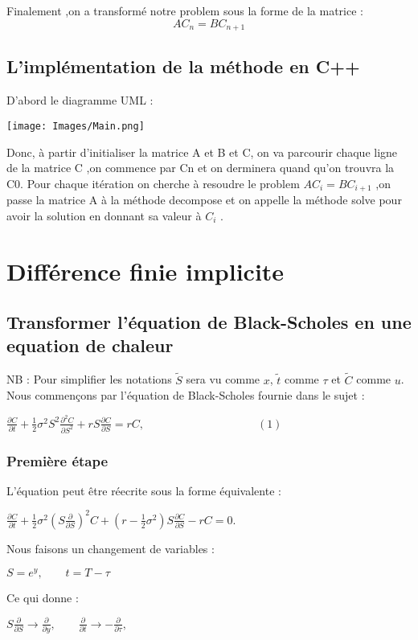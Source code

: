 \documentclass[a4paper, 12pt]{article}
\begin{document}
Finalement ,on a transformé notre problem sous la forme de la matrice :\\
\[
\boxed{AC_n = BC_{n+1}}
\]

\subsection{L'implémentation de la méthode en C++}

D'abord le diagramme UML :


\texttt{[image: Images/Main.png]} 

Donc,  à partir d'initialiser la matrice A et B et C, on va parcourir chaque ligne de la matrice C
,on commence par Cn et on derminera quand qu'on trouvra la C0. Pour chaque itération on cherche à resoudre le problem $AC_i = BC_{i+1}$ ,on passe la matrice A à la méthode decompose et on appelle la méthode solve pour avoir la solution en donnant sa valeur à $C_i$ .

\section{Différence finie implicite}
\subsection{Transformer l'équation de Black-Scholes en une equation de chaleur}
NB : Pour simplifier les notations $\widetilde{S}$ sera vu comme $x$, $\widetilde{t}$ comme $\tau$ et $\widetilde{C}$ comme $u$.
Nous commençons par l'équation de Black-Scholes fournie dans le sujet :

$\frac{\partial C}{\partial t}+\frac{1}{2}\sigma^2S^2\frac{\partial^2 C}{\partial S^2}+ rS\frac{\partial C}{\partial S}=rC,\qquad\qquad\qquad\qquad\qquad(1)$

\subsubsection{Première étape}
L'équation peut être réecrite sous la forme équivalente :

$\frac{\partial C}{\partial t}+\frac{1}{2}\sigma^2\left(S\frac{\partial }{\partial S}\right)^2C+\left(r-\frac{1}{2}\sigma^2\right)S\frac{\partial C}{\partial S}-rC=0.$

Nous faisons un changement de variables :

$S=e^y,\qquad t=T-\tau$

Ce qui donne :

$S\frac{\partial }{\partial S}\to\frac{\partial}{\partial y},\qquad \frac{\partial}{\partial t}\to - \frac{\partial}{\partial \tau},$
\end{document}

